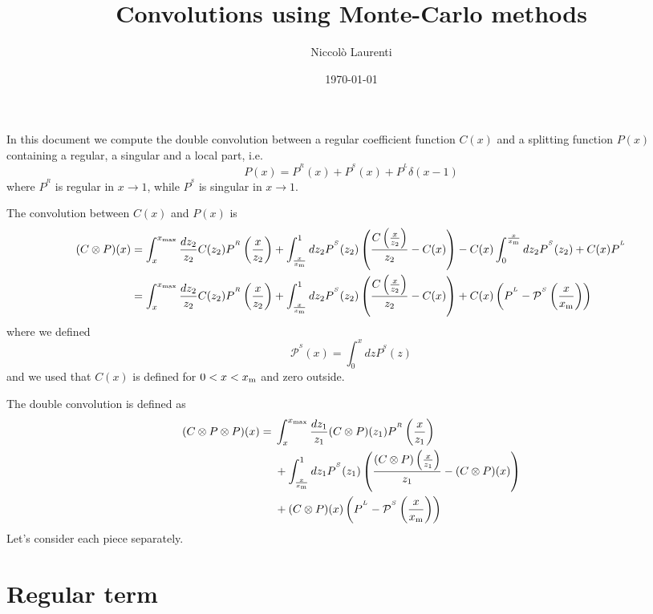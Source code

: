 \documentclass[a4paper]{article}
\title{Convolutions using Monte-Carlo methods}
\author{Niccolò Laurenti}
\date{\today}
\newcommand{\PR}[0]{P^{^R}}
\newcommand{\PS}[0]{P^{^S}}
\newcommand{\PmS}[0]{\mathcal{P}^{^S}}
\newcommand{\PL}[0]{P^{^L}}
\newcommand{\xm}[0]{x_{\rm m}}
\begin{document}
	In this document we compute the double convolution between a regular coefficient function $C(x)$ and a splitting function $P(x)$ containing a regular, a singular and a local part, i.e.
	\begin{equation}
		P(x) = P^{^R}(x) + P^{^S}(x) + P^{^L} \delta(x-1)
	\end{equation}
where $\PR$ is regular in $x\rightarrow 1$, while $\PS$ is singular in $x\rightarrow 1$.

The convolution between $C(x)$ and $P(x)$ is
\begin{equation}
	\begin{split}
	(C \otimes P)(x)&=\int_x^{x_{\rm max}} \frac{dz_2}{z_2} C(z_2) \PR \left(\frac{x}{z_2}\right) + \int_{\frac{x}{\xm}}^1dz_2 \PS(z_2) \left( \frac{C\left(\frac{x}{z_2}\right)}{z_2} - C(x)\right)-C(x)\int_0^{\frac{x}{\xm}}dz_2\PS(z_2) + C(x)\PL \\
	&=\int_x^{x_{\rm max}} \frac{dz_2}{z_2} C(z_2) \PR \left(\frac{x}{z_2}\right) + \int_{\frac{x}{\xm}}^1dz_2 \PS(z_2) \left( \frac{C\left(\frac{x}{z_2}\right)}{z_2} - C(x)\right)+ C(x)\left(\PL - \PmS\left(\frac{x}{\xm}\right)\right)
\end{split}
\end{equation}
where we defined
\begin{equation*}
	\PmS(x) = \int_0^{x}dz\PS(z)
\end{equation*}
and we used that $C(x)$ is defined for $0<x<\xm$ and zero outside.

The double convolution is defined as
\begin{equation}
	\begin{split}
		(C \otimes P \otimes P)(x)  ={}& \int_x^{x_{\rm max}} \frac{dz_1}{z_1} (C \otimes P)(z_1) \PR \left(\frac{x}{z_1}\right) \\
		&+ \int_{\frac{x}{\xm}}^1dz_1 \PS(z_1) \left( \frac{(C \otimes P)\left(\frac{x}{z_1}\right)}{z_1} - (C \otimes P)(x)\right)\\
		& + (C \otimes P)(x)\left(\PL - \PmS\left(\frac{x}{\xm}\right)\right)
	\end{split}
\end{equation}
Let's consider each piece separately.
\section{Regular term}
\end{document}
